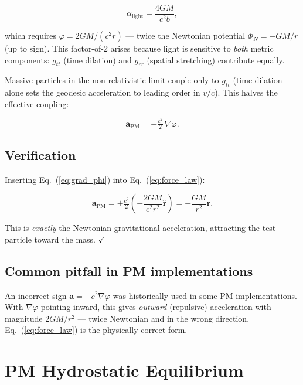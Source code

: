 \documentclass[11pt,a4paper]{article}
\newcommand{\PM}{\text{PM}}
\begin{document}
\begin{equation}
  \alpha_\text{light} = \frac{4GM}{c^2 b},
  \label{eq:deflection}
\end{equation}

which requires $\varphi = 2GM/(c^2 r)$ — twice the Newtonian potential
$\Phi_N = -GM/r$ (up to sign).  This factor-of-2 arises because light is
sensitive to \emph{both} metric components: $g_{tt}$ (time dilation) and
$g_{rr}$ (spatial stretching) contribute equally.

Massive particles in the non-relativistic limit couple only to $g_{tt}$ (time
dilation alone sets the geodesic acceleration to leading order in $v/c$).
This halves the effective coupling:

\begin{equation}
  \boxed{\mathbf{a}_\PM = +\tfrac{c^2}{2}\,\nabla\varphi.}
  \label{eq:force_law}
\end{equation}

\subsection{Verification}

Inserting Eq.~(\ref{eq:grad_phi}) into Eq.~(\ref{eq:force_law}):

\begin{equation}
  \mathbf{a}_\PM = +\tfrac{c^2}{2}\left(-\frac{2GM}{c^2 r^2}\hat{\mathbf{r}}\right)
                = -\frac{GM}{r^2}\hat{\mathbf{r}}.
  \label{eq:newton}
\end{equation}

This is \emph{exactly} the Newtonian gravitational acceleration, attracting the
test particle toward the mass. $\checkmark$

\subsection{Common pitfall in PM implementations}

An incorrect sign $\mathbf{a} = -c^2\nabla\varphi$ was historically used in
some PM implementations.  With $\nabla\varphi$ pointing inward, this gives
\emph{outward} (repulsive) acceleration with magnitude $2GM/r^2$ — twice
Newtonian and in the wrong direction.  Eq.~(\ref{eq:force_law}) is the
physically correct form.

\section{PM Hydrostatic Equilibrium}
\end{document}
